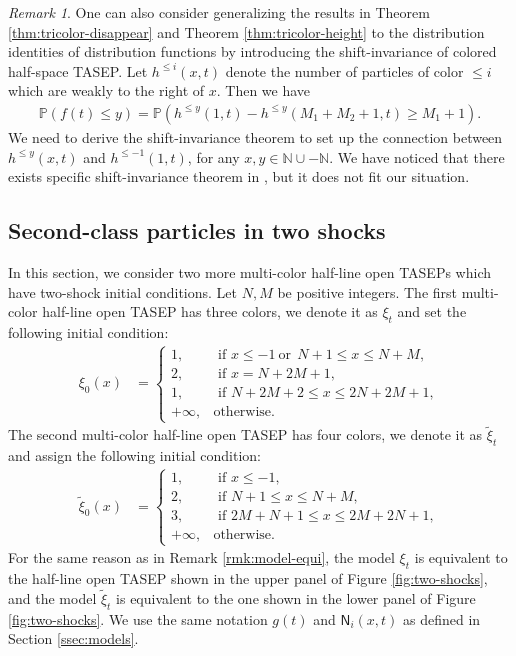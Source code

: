 \documentclass[12pt,a4paper]{amsart}
\theoremstyle{remark}
\newtheorem{remark}[theorem]{Remark}
\numberwithin{equation}{section} \numberwithin{theorem}{section}
\begin{document}
\begin{remark}
One can also consider generalizing the results in Theorem \ref{thm:tricolor-disappear} and Theorem \ref{thm:tricolor-height} to the distribution identities of distribution functions by introducing the shift-invariance of colored half-space TASEP. Let $h^{\leq i}(x,t)$ denote the number of particles of color $\leq i$ which are weakly to the right of $x$. Then we have 
\begin{align*}
\mathbb{P}(f(t) \leq y)=\mathbb{P}(h^{\leq y}(1,t)-h^{\leq y}(M_1+M_2+1,t) \geq M_1+1).
\end{align*}
We need to derive the shift-invariance theorem to set up the connection between $h^{\leq y}(x,t)$ and $h^{\leq -1}(1,t)$, for any $x,y \in \mathbb{N}\cup -\mathbb{N}$. We have noticed that there exists specific shift-invariance theorem in \cite{He22}, but it does not fit our situation.
\end{remark}


\subsection{Second-class particles in two shocks}
\label{ssec:two-shock}
In this section, we consider two more multi-color half-line open TASEPs which have two-shock initial conditions. Let $N,M$ be positive integers. The first multi-color half-line open TASEP has three colors, we denote it as $\xi_{t}$ and set the following initial condition:
\begin{align}
 \label{eq:xi}
\xi_{0}(x)&=
\begin{cases}
1, & \text{ if } x \leq -1 \ \text{or}\ \ N+1 \leq x \leq N+M, \\
2, & \text{ if } x=N+2M+1, \\
1, & \text{ if } N+2M+2 \leq x \leq 2N+2M+1, \\
+\infty, & \text{otherwise}.
\end{cases}
\end{align}
The second multi-color half-line open TASEP has four colors, we denote it as $\tilde\xi_{t}$ and assign the following initial condition:
\begin{align}
 \label{eq:tilde-xi}
\tilde\xi_{0}(x)&=
\begin{cases}
1, & \text{ if } x \leq -1,  \\
2, & \text{ if } N+1 \leq x \leq N+M, \\
3, & \text{ if } 2M+N+1 \leq x \leq 2M+2N+1, \\
+\infty, & \text{otherwise}.
\end{cases}
\end{align}
For the same reason as in Remark \ref{rmk:model-equi}, the model $\xi_{t}$ is equivalent to the half-line open TASEP shown in the upper panel of Figure \ref{fig:two-shocks}, and the model $\tilde\xi_{t}$ is equivalent to the one shown in the lower panel of Figure \ref{fig:two-shocks}. We use the same notation $g(t)$ and $\mathsf{N}_{i}(x,t)$ as defined in Section \ref{ssec:models}.
\end{document}
